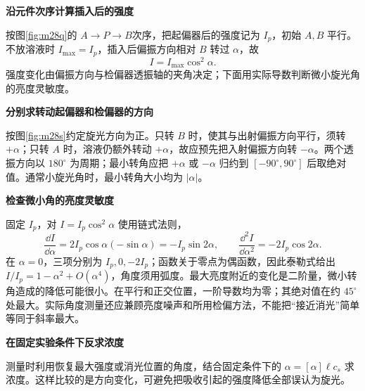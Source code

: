 \begin{solution}\textbf{沿元件次序计算插入后的强度}\par\nobreak
按图\ref{fig:m28q}的 $A\to P\to B$次序，把起偏器后的强度记为 \(I_p\)，初始 \(A,B\) 平行。不放溶液时 \(I_{\max}=I_p\)，插入后偏振方向相对 \(B\) 转过 \(\alpha\)，故
\[
 \boxed{I=I_{\max}\cos^2\alpha}.
\]
强度变化由偏振方向与检偏器透振轴的夹角决定；下面用实际导数判断微小旋光角的亮度灵敏度。


\par\medskip{}\noindent\textbf{分别求转动起偏器和检偏器的方向}\par\nobreak
按图\ref{fig:m28s}约定旋光方向为正。只转 \(B\) 时，使其与出射偏振方向平行，须转 \(+\alpha\)；只转 \(A\) 时，溶液仍额外转动 \(+\alpha\)，故应预先把入射偏振方向转 \(-\alpha\)。两个透振方向以 $180^\circ$ 为周期；最小转角应把 $+\alpha$ 或 $-\alpha$ 归约到 $[-90^\circ,90^\circ]$ 后取绝对值。通常小旋光角时，最小转角大小均为 $|\alpha|$。



\par\medskip{}\noindent\textbf{检查微小角的亮度灵敏度}\par\nobreak
固定 $I_p$，对 $I=I_p\cos^2\alpha$ 使用链式法则，
\[
 \frac{\dd I}{\dd\alpha}=2I_p\cos\alpha(-\sin\alpha)=-I_p\sin2\alpha,
 \qquad \frac{\dd^2I}{\dd\alpha^2}=-2I_p\cos2\alpha.
\]
在 $\alpha=0$，三项分别为 $I_p,0,-2I_p$；函数关于零点为偶函数，因此泰勒式给出 $I/I_p=1-\alpha^2+O(\alpha^4)$，角度须用弧度。最大亮度附近的变化是二阶量，微小转角造成的降低可能很小。在平行和正交位置，一阶导数均为零；其绝对值在约 $45^\circ$ 处最大。实际角度测量还应兼顾亮度噪声和所用检偏方法，不能把“接近消光”简单等同于斜率最大。



\par\medskip{}\noindent\textbf{在固定实验条件下反求浓度}\par\nobreak
测量时利用恢复最大强度或消光位置的角度，结合固定条件下的 \(\alpha=[\alpha]\ell c_s\) 求浓度。这样比较的是方向变化，可避免把吸收引起的强度降低全部误认为旋光。
\end{solution}

